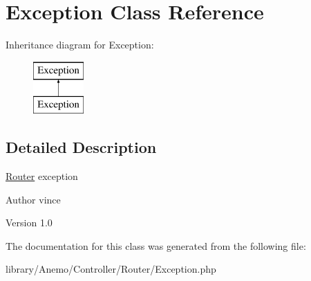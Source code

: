 \hypertarget{class_anemo_1_1_controller_1_1_router_1_1_exception}{
\section{Exception Class Reference}
\label{class_anemo_1_1_controller_1_1_router_1_1_exception}
}
Inheritance diagram for Exception:\begin{figure}[H]
\begin{center}
\leavevmode
\includegraphics[height=2.000000cm]{class_anemo_1_1_controller_1_1_router_1_1_exception}
\end{center}
\end{figure}


\subsection{Detailed Description}
\hyperlink{namespace_anemo_1_1_controller_1_1_router}{Router} exception \begin{DoxyAuthor}{Author}
vince 
\end{DoxyAuthor}
\begin{DoxyVersion}{Version}
1.0 
\end{DoxyVersion}


The documentation for this class was generated from the following file:\begin{DoxyCompactItemize}
\item 
library/Anemo/Controller/Router/Exception.php\end{DoxyCompactItemize}
